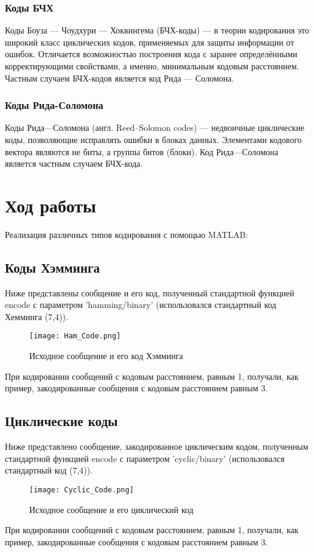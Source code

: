 \subsubsection{Коды БЧХ}
Коды Боуза — Чоудхури — Хоквингема (БЧХ-коды) — в теории кодирования это широкий класс циклических кодов, применяемых для защиты информации от ошибок. Отличается возможностью построения кода с заранее определёнными корректирующими свойствами, а именно, минимальным кодовым расстоянием. Частным случаем БЧХ-кодов является код Рида — Соломона.

\subsubsection{Коды Рида-Соломона}
Коды Рида—Соломона (англ. Reed–Solomon codes) — недвоичные циклические коды, позволяющие исправлять ошибки в блоках данных. Элементами кодового вектора являются не биты, а группы битов (блоки).
Код Рида—Соломона является частным случаем БЧХ-кода.

\section{Ход работы}

Реализация различных типов кодирования с помощью MATLAB:


\subsection{Коды Хэмминга}
Ниже представлены сообщение и его код, полученный стандартной функцией encode с параметром 'hamming/binary' (использовался стандартный код Хемминга (7,4)).
\begin{figure}[H]
	\begin{center}
		\texttt{[image: Ham\_Code.png]}
		\caption{Исходное сообщение и его код Хэмминга} %
		\label{Ham_Code} %
	\end{center}
\end{figure}
При кодировании сообщений с кодовым расстоянием, равным 1, получали, как пример, закодированные сообщения с кодовым расстоянием равным 3.

\subsection{Циклические коды}
Ниже представлено сообщение, закодированное циклическим кодом, полученным стандартной функцией encode с параметром 'cyclic/binary' (использовался стандартный код (7,4)).
\begin{figure}[H]
	\begin{center}
		\texttt{[image: Cyclic\_Code.png]}
		\caption{Исходное сообщение и его циклический код} %
		\label{Cyclic_Code} %
	\end{center}
\end{figure}
При кодировании сообщений с кодовым расстоянием, равным 1, получали, как пример, закодированные сообщения с кодовым расстоянием равным 3.

